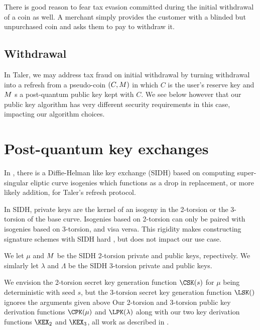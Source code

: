 \documentclass{llncs}
\begin{document}
\smallskip

There is good reason to fear tax evasion committed during the
initial withdrawal of a coin as well.  A merchant simply provides
the customer with a blinded but unpurchased coin and asks them to
pay to withdraw it.

\subsection{Withdrawal}\label{subsec:withdrawal}

In Taler, we may address tax fraud on initial withdrawal by turning
withdrawal into a refresh from a pseudo-coin $(C,M)$ in which 
 $C$ is the user's reserve key \cite[??]{Taler} and
 $M$ s a post-quantum public key kept with $C$.
We see below however that our public key algorithm has very different
security requirements in this case, impacting our algorithm choices.


\section{Post-quantum key exchanges}


In \cite{SIDH?,SIDH16}, there is a Diffie-Helman like key exchange
(SIDH) based on computing super-singular eliptic curve isogenies 
which functions as a drop in replacement, or more likely addition,
for Taler's refresh protocol.

In SIDH, private keys are the kernel of an isogeny in the 2-torsion
or the 3-torsion of the base curve.  Isogenies based on 2-torsion can
only be paired with isogenies based on 3-torsion, and visa versa.  
This rigidity makes constructing signature schemes with SIDH hard
\cite{??SIDHsig??}, but does not impact our use case.  

We let $\mu$ and $M$ be the SIDH 2-torsion private and public keys,
repectively.  We simlarly let $\lambda$ and $\Lambda$ be the
SIDH 3-torsion private and public keys.  

We envision the 2-torsion secret key generation function $\CSK(s)$
for $\mu$ being deterministic with seed $s$, but the 3-torsion secret
key generation function $\LSK()$ ignores the arguments given above 
Our 2-torsion and 3-torsion public key derivation functions
$\CPK(\mu)$ and $\LPK(\lambda)$ along with our two key derivation
functions $\KEX_2$ and $\KEX_3$, all work as described in
\cite[\S6]{SIDH16}.
\end{document}
